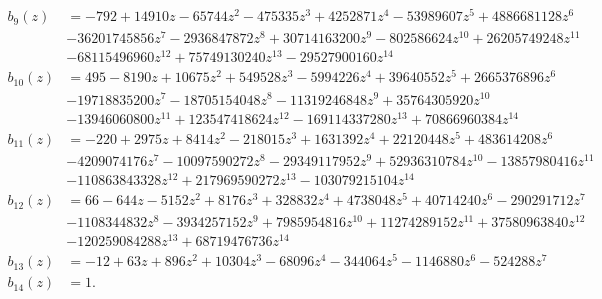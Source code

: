 \documentclass[reqno]{amsart}
\theoremstyle{definition}
\theoremstyle{remark}
\numberwithin{equation}{section}
\begin{document}
\begin{align*}
b_9(z)
&=-792 + 14910 z - 65744 z^2 - 475335 z^3 + 4252871 z^4 - 53989607 z^5 + 4886681128 z^6\\ 
&- 36201745856 z^7 - 2936847872 z^8 + 30714163200 z^9 - 802586624 z^{10} + 26205749248 z^{11}\\ 
&- 68115496960 z^{12} + 75749130240 z^{13} - 29527900160 z^{14}\\
b_{10}(z)
&=495 - 8190 z + 10675 z^2 + 549528 z^3 - 5994226 z^4 + 39640552 z^5 + 2665376896 z^6\\ 
&- 19718835200 z^7 - 18705154048 z^8 - 11319246848 z^9 + 35764305920 z^{10}\\ 
&- 13946060800 z^{11} + 123547418624 z^{12} - 169114337280 z^{13} + 70866960384 z^{14}\\
b_{11}(z)
&=-220 + 2975 z + 8414 z^2 - 218015 z^3 + 1631392 z^4 + 22120448 z^5 + 483614208 z^6\\ 
&- 4209074176 z^7 - 10097590272 z^8 - 29349117952 z^9 + 52936310784 z^{10} - 13857980416 z^{11}\\ 
&- 110863843328 z^{12} + 217969590272 z^{13} - 103079215104 z^{14}\\
b_{12}(z)
&=66 - 644 z - 5152 z^2 + 8176 z^3 + 328832 z^4 + 4738048 z^5 + 40714240 z^6 - 290291712 z^7\\
&- 1108344832 z^8 - 3934257152 z^9 + 7985954816 z^{10} + 11274289152 z^{11} + 37580963840 z^{12}\\ 
&- 120259084288 z^{13} + 68719476736 z^{14}\\
b_{13}(z)
&=-12 + 63 z + 896 z^2 + 10304 z^3 - 68096 z^4 - 344064 z^5 - 1146880 z^6 - 524288 z^7\\
b_{14}(z) &= 1.
\end{align*}
\end{document}
